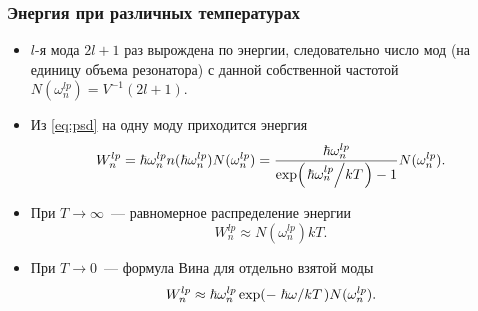 \documentclass[compress]{beamer}
\begin{document}

    \begin{frame}\frametitle{Энергия при различных температурах}

        \begin{itemize}\justifying

            \item $l$-я мода $2l + 1$ раз вырождена по энергии, следовательно число мод (на единицу объема резонатора) с данной собственной частотой $N(\omega^{lp}_n) = V^{-1} (2l + 1)$.

            \item Из \autoref{eq:psd} на одну моду приходится энергия
            \begin{equation*}
                W^{lp}_n = \hbar\omega^{lp}_n n(\hbar\omega^{lp}_n) N(\omega^{lp}_n) = \frac{\hbar\omega^{lp}_n}{\exp(\flatfrac{\hbar\omega^{lp}_n}{kT}) - 1} N(\omega^{lp}_n) .
            \end{equation*}

            \item При $T \to \infty$~--- равномерное распределение энергии
            \begin{equation*}
                W^{lp}_n \approx N(\omega^{lp}_n) kT .
            \end{equation*}

            \item При $T \to 0$~--- формула Вина для отдельно взятой моды
            \begin{equation*}
                W^{lp}_n \approx \hbar\omega^{lp}_n \exp(-\flatfrac{\hbar\omega}{kT}) N(\omega^{lp}_n) .
            \end{equation*}

        \end{itemize}

    \end{frame}

\end{document}
